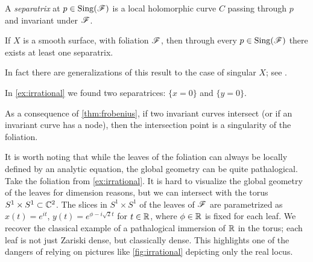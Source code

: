 \begin{definition}
    A \emph{separatrix} at $p\in\operatorname{Sing}(\mathscr{F})$ is a local holomorphic curve $C$
    passing through $p$ and invariant under $\mathscr{F}$.
\end{definition}

\begin{theorem}\label{thm:separatrix}
    If $X$ is a smooth surface, with foliation $\mathscr{F}$, then through every
    $p\in\operatorname{Sing}(\mathscr{F})$ there exists at least one separatrix.
\end{theorem}

In fact there are generalizations of this result to the case of singular $X$;
see \cite{camacho_88}.

\begin{example}
    In \cref{ex:irrational} we found two separatrices: $\{x=0\}$ and
    $\{y=0\}$.
\end{example}

\begin{remark}
    As a consequence of \cref{thm:frobenius}, if two invariant curves intersect
    (or if an invariant curve has a node), then the intersection point is a
    singularity of the foliation.
\end{remark}

It is worth noting that while the leaves of the foliation can always be locally
defined by an analytic equation, the global geometry can be quite pathalogical.
Take the foliation from \cref{ex:irrational}. It is hard to visualize the global
geometry of the leaves for dimension reasons, but we can intersect with the
torus $S^1\times S^1\subset\mathbb{C}^2$. The slices in $S^1\times S^1$ of the leaves of
$\mathscr{F}$ are parametrized as $x(t)=e^{it}$, $y(t)=e^{\phi-i\sqrt2t}$ for
$t\in\mathbb{R}$, where $\phi\in\mathbb{R}$ is fixed for each leaf. We recover the classical
example of a pathalogical immersion of $\mathbb{R}$ in the torus; each leaf is not just
Zariski dense, but classically dense. This highlights one of the dangers of
relying on pictures like \cref{fig:irrational} depicting only the real locus.

